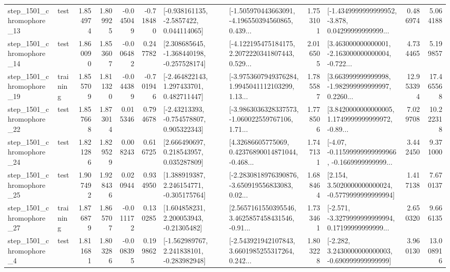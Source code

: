 \begin{tabular}{llrrrrllrlrr}
 step\_1501\_chromophore\_13 &      test &      1.854974 &    1.809925 &     -0.045049 & -0.718480 &     [-0.938161135, -2.5857422, 0.044114065] &  [-1.505970443663091, -4.196550394560865, 0.439... &       1.753101 &  [-1.4349999999999952, -3.878, 0.04299999999999... &            0.486974 &          5.064188 \\
 step\_1501\_chromophore\_14 &      test &      1.860090 &    1.853607 &     -0.006482 &  0.247782 &   [2.308685645, -1.368440198, -0.257528174] &  [-4.122195475184175, 2.2072220341807443, 0.529... &       2.016505 &  [3.463000000000001, -2.163000000000004, -0.722... &            4.734465 &          5.199857 \\
 step\_1501\_chromophore\_19 &  training &      1.855709 &    1.811320 &     -0.044389 & -0.701946 &    [-2.464822143, 1.297433701, 0.482711447] &  [-3.9753607949376284, 1.9945041112103299, 1.13... &       1.785587 &  [3.663999999999998, -1.982999999999997, 0.2260... &           12.953394 &         17.465568 \\
 step\_1501\_chromophore\_22 &      test &      1.857668 &    1.873014 &      0.015346 &  0.794678 &    [-2.43213393, -0.754578807, 0.905322343] &  [-3.9863036328337573, -1.060022559767106, 1.71... &       1.778506 &  [3.8420000000000005, 1.1749999999999972, -0.89... &            7.029708 &         10.222318 \\
 step\_1501\_chromophore\_24 &      test &      1.821286 &    1.829529 &      0.008243 &  0.616725 &     [2.666490697, 0.218543957, 0.035287809] &  [4.32686605775069, 0.42376890014871044, -0.468... &       1.747131 &  [-4.07, -0.11599999999999966, -0.1669999999999... &            3.442450 &          9.371000 \\
 step\_1501\_chromophore\_25 &      test &      1.907492 &    1.928436 &      0.020944 &  0.934950 &    [1.388919387, 2.246154771, -0.305175764] &  [-2.2830818976390876, -3.650919556833083, 0.02... &       1.688464 &   [2.154, 3.5020000000000024, -0.5779999999999994] &            1.417138 &          7.670137 \\
 step\_1501\_chromophore\_27 &  training &      1.876879 &    1.865707 &     -0.011172 &  0.130285 &     [1.604858231, 2.200053943, -0.21305482] &  [2.5657161550395546, 3.4625857458431546, -0.91... &       1.733461 &  [-2.571, -3.3279999999999994, 0.17199999999999... &            2.650320 &          9.666135 \\
  step\_1501\_chromophore\_4 &      test &      1.811681 &    1.803286 &     -0.008395 &  0.199862 &   [-1.562989767, 2.241838101, -0.283982948] &  [-2.543921942107843, 3.6601985255317264, 0.242... &       1.803228 &   [-2.282, 3.2430000000000003, -0.690999999999999] &            3.960130 &         13.008916 \\

\end{tabular}

